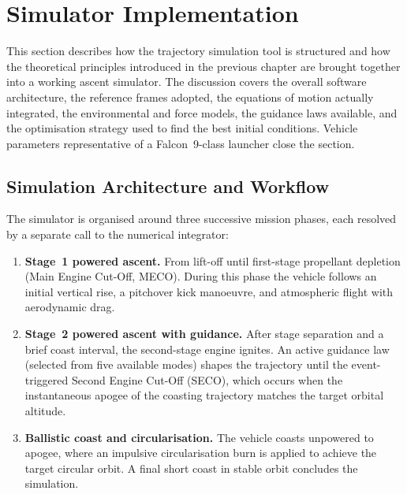 
\section{Simulator Implementation}
\label{sec:simulator_implementation}

This section describes how the trajectory simulation tool is structured and how
the theoretical principles introduced in the previous chapter are brought
together into a working ascent simulator.  The discussion covers the overall
software architecture, the reference frames adopted, the equations of motion
actually integrated, the environmental and force models, the guidance laws
available, and the optimisation strategy used to find the best initial
conditions.  Vehicle parameters representative of a Falcon~9-class launcher
close the section.

\subsection{Simulation Architecture and Workflow}
\label{ssec:sim_architecture}

The simulator is organised around three successive mission phases, each
resolved by a separate call to the numerical integrator:

\begin{enumerate}
  \item \textbf{Stage~1 powered ascent.}  From lift-off until first-stage
        propellant depletion (Main Engine Cut-Off, MECO).  During this phase
        the vehicle follows an initial vertical rise, a pitchover kick
        manoeuvre, and atmospheric flight with aerodynamic drag.

  \item \textbf{Stage~2 powered ascent with guidance.}  After stage separation
        and a brief coast interval, the second-stage engine ignites.  An active
        guidance law (selected from five available modes) shapes the trajectory
        until the event-triggered Second Engine Cut-Off (SECO), which occurs
        when the instantaneous apogee of the coasting trajectory matches the
        target orbital altitude.

  \item \textbf{Ballistic coast and circularisation.}  The vehicle coasts
        unpowered to apogee, where an impulsive circularisation burn is applied
        to achieve the target circular orbit.  A final short coast in stable
        orbit concludes the simulation.
\end{enumerate}

